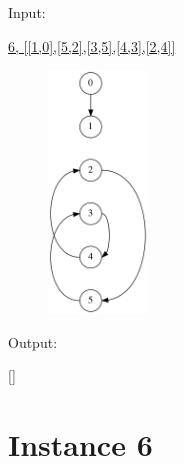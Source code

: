 \documentclass[10pt]{article}
\begin{document}
\squishlist
  \item \parbox{40pt}{Input:}  \url{6, [[1,0],[5,2],[3,5],[4,3],[2,4]]}
\squishend
\begin{figure}[h!]
  \hspace{50pt}
  \hspace{50pt}
  \hspace{50pt}
  \includegraphics[width=75pt]{Input/Graph_5b.gv.png}
\end{figure}

\squishlist
  \item \parbox{40pt}{Output:} \url{[]}
\squishend


\newpage

\section*{Instance 6}
\end{document}
